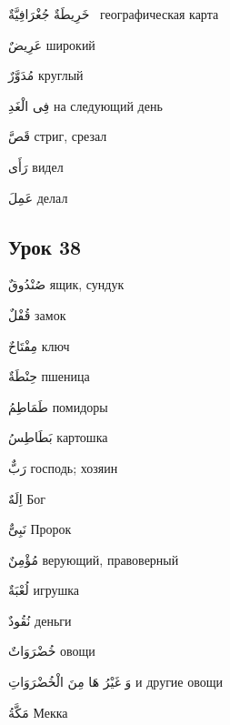 \documentclass[a5paper]{article}
\newcommand\textstyleDropCaps[1]{#1}
\newcommand\textstyleCaptioncharacters[1]{#1}
\begin{document}
\textstyleCaptioncharacters{خَرِيطَةٌ جُغْرَافِيَّةٌ \ }\textstyleDropCaps{гео­графическая карта‎}

\textstyleCaptioncharacters{عَرِيضٌ }\textstyleDropCaps{широкий‎}

\textstyleCaptioncharacters{مُدَوَّرٌ }\textstyleDropCaps{круглый‎}

\textstyleCaptioncharacters{فِى الْغَدِ }\textstyleDropCaps{на следующий день‎}

\textstyleCaptioncharacters{قَصَّ }\textstyleDropCaps{стриг, срезал‎}

\textstyleCaptioncharacters{رَأَى }\textstyleDropCaps{видел‎}

\textstyleCaptioncharacters{عَمِلَ }\textstyleDropCaps{делал‎}

\subsection[Урок 38‎]{\textstyleDropCaps{Урок 38‎}}
\textstyleCaptioncharacters{صُنْدُوقٌ }\textstyleDropCaps{ящик, сундук‎}

\textstyleCaptioncharacters{قُفْلٌ }\textstyleDropCaps{замок‎}

\textstyleCaptioncharacters{مِفْتَاحٌ }\textstyleDropCaps{ключ‎}

\textstyleCaptioncharacters{حِنْطَةٌ }\textstyleDropCaps{пшеница‎}

\textstyleCaptioncharacters{طَمَاطِمُ }\textstyleDropCaps{помидоры‎}

\textstyleCaptioncharacters{بَطَاطِسُ }\textstyleDropCaps{картошка‎}

\textstyleCaptioncharacters{رَبٌّ }\textstyleDropCaps{господь; хозяин‎}

\textstyleCaptioncharacters{اِلَهٌ }\textstyleDropCaps{Бог‎}

\textstyleCaptioncharacters{نَبِىٌّ }\textstyleDropCaps{Пророк‎}

\textstyleCaptioncharacters{مُؤْمِنٌ }\textstyleDropCaps{верующий, право­верный‎}

\textstyleCaptioncharacters{لُعْبَةٌ }\textstyleDropCaps{игрушка‎}

\textstyleCaptioncharacters{نُقُودٌ }\textstyleDropCaps{деньги‎}

\textstyleCaptioncharacters{خُضْرَوَاتٌ }\textstyleDropCaps{овощи‎}

\textstyleCaptioncharacters{وَ غَيْرُ هَا مِنَ الْخُضْرَوَاتِ }\textstyleDropCaps{и другие овощи‎}

\textstyleCaptioncharacters{مَكَّةُ }\textstyleDropCaps{Мекка‎}
\end{document}
